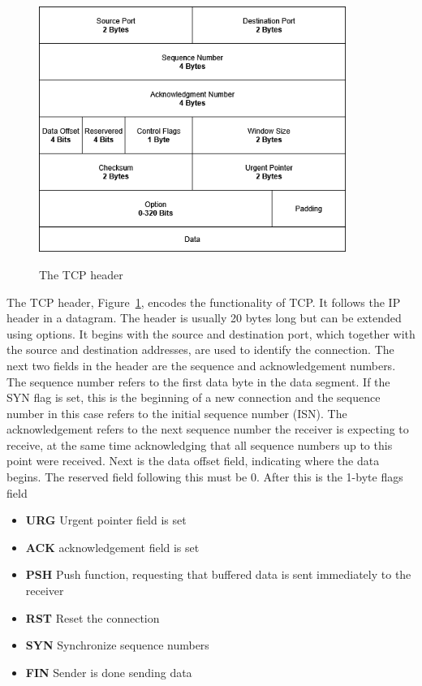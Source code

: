 \documentclass[english, 12pt, a4paper, elec, utf8, a-2b, online]{aaltothesis}
\begin{document}
\begin{figure}[t]
	\centering
	\includegraphics[alt={A block diagram of the TCP header format, detailing its fields and their sizes.}, height=8cm]{./images/tcp_header.png}
	\caption{The TCP header}
	\label{fig:tcp_header}
\end{figure}
The TCP header, Figure~\ref{fig:tcp_header}, encodes the functionality of TCP.
It follows the IP header in a datagram. The header is usually 20 bytes long but
can be extended using options. It begins with the source and destination port, which
together with the source and destination addresses, are used to identify the connection.
The next two fields in the header are the sequence and acknowledgement numbers. The
sequence number refers to the first data byte in the data segment.
If the SYN flag is set, this is the beginning of a new connection and the sequence
number in this case refers to the initial sequence number (ISN). The acknowledgement
refers to the next sequence number the receiver is
expecting to receive, at the same time acknowledging that all sequence numbers
up to this point were received. Next is the data offset field, indicating where
the data begins. The reserved field following this must be 0. After this is the
1-byte flags field
\begin{itemize}
	\item \textbf{URG} Urgent pointer field is set
	\item \textbf{ACK} acknowledgement field is set
	\item \textbf{PSH} Push function, requesting that buffered data is sent immediately to the receiver
	\item \textbf{RST} Reset the connection
	\item \textbf{SYN} Synchronize sequence numbers
	\item \textbf{FIN} Sender is done sending data
\end{itemize}
\end{document}
